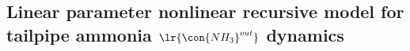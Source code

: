 \subsection{Linear parameter nonlinear recursive model for tailpipe ammonia $\lr{\con{NH_3}^{out}}$ dynamics}
